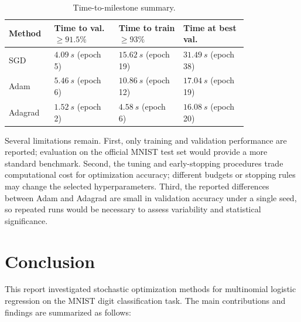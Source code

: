 \documentclass[11pt]{article}
\numberwithin{equation}{section}
\numberwithin{table}{section}
\numberwithin{figure}{section}
\numberwithin{algorithm}{section}
\begin{document}
\begin{table}[H]
\caption{Time-to-milestone summary.}
\label{tab:speed}
\centering
{\setlength{\tabcolsep}{3pt}
\begin{tabular}{@{}l>{\raggedright\arraybackslash}p{0.27\linewidth}>{\raggedright\arraybackslash}p{0.27\linewidth}>{\raggedright\arraybackslash}p{0.27\linewidth}@{}}
\toprule
\textbf{Method} & \textbf{Time to val.\(\ge 91.5\%\)} & \textbf{Time to train\(\ge 93\%\)} & \textbf{Time at best val.} \\
\midrule
SGD & \(\SI{4.09}{s}\) (epoch 5) & \(\SI{15.62}{s}\) (epoch 19) & \(\SI{31.49}{s}\) (epoch 38) \\
Adam & \(\SI{5.46}{s}\) (epoch 6) & \(\SI{10.86}{s}\) (epoch 12) & \(\SI{17.04}{s}\) (epoch 19) \\
Adagrad & \(\SI{1.52}{s}\) (epoch 2) & \(\SI{4.58}{s}\) (epoch 6) & \(\SI{16.08}{s}\) (epoch 20) \\
\bottomrule
\end{tabular}
}
\end{table}

Several limitations remain. First, only training and validation performance are reported; evaluation on the official MNIST test set would provide a more standard benchmark. Second, the tuning and early-stopping procedures trade computational cost for optimization accuracy; different budgets or stopping rules may change the selected hyperparameters. Third, the reported differences between Adam and Adagrad are small in validation accuracy under a single seed, so repeated runs would be necessary to assess variability and statistical significance.

\section{Conclusion}
This report investigated stochastic optimization methods for multinomial logistic regression on the MNIST digit classification task. The main contributions and findings are summarized as follows:
\end{document}

